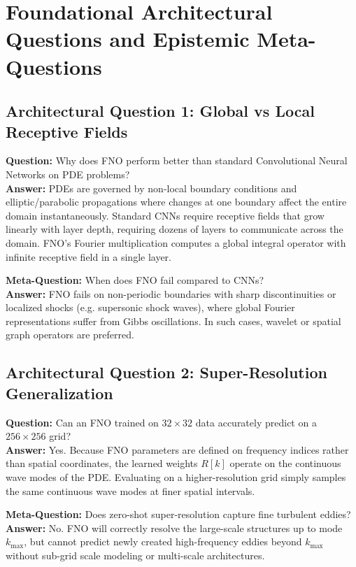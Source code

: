 \documentclass[11pt,a4paper]{article}
\theoremstyle{definition}
\begin{document}
\section{Foundational Architectural Questions and Epistemic Meta-Questions}

\subsection{Architectural Question 1: Global vs Local Receptive Fields}
\textbf{Question:} Why does FNO perform better than standard Convolutional Neural Networks on PDE problems?\\
\textbf{Answer:} PDEs are governed by non-local boundary conditions and elliptic/parabolic propagations where changes at one boundary affect the entire domain instantaneously. Standard CNNs require receptive fields that grow linearly with layer depth, requiring dozens of layers to communicate across the domain. FNO's Fourier multiplication computes a global integral operator with infinite receptive field in a single layer.

\textbf{Meta-Question:} When does FNO fail compared to CNNs?\\
\textbf{Answer:} FNO fails on non-periodic boundaries with sharp discontinuities or localized shocks (e.g. supersonic shock waves), where global Fourier representations suffer from Gibbs oscillations. In such cases, wavelet or spatial graph operators are preferred.

\subsection{Architectural Question 2: Super-Resolution Generalization}
\textbf{Question:} Can an FNO trained on $32 \times 32$ data accurately predict on a $256 \times 256$ grid?\\
\textbf{Answer:} Yes. Because FNO parameters are defined on frequency indices rather than spatial coordinates, the learned weights $R[k]$ operate on the continuous wave modes of the PDE. Evaluating on a higher-resolution grid simply samples the same continuous wave modes at finer spatial intervals.

\textbf{Meta-Question:} Does zero-shot super-resolution capture fine turbulent eddies?\\
\textbf{Answer:} No. FNO will correctly resolve the large-scale structures up to mode $k_{\max}$, but cannot predict newly created high-frequency eddies beyond $k_{\max}$ without sub-grid scale modeling or multi-scale architectures.
\end{document}
